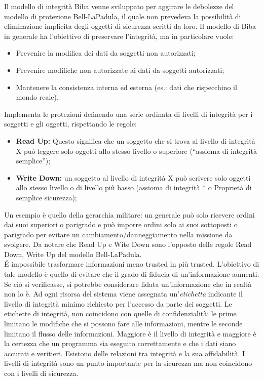 Il modello di integrità Biba venne sviluppato per aggirare le debolezze del 
modello di protezione
Bell-LaPadula, il quale non prevedeva la possibilità di eliminazione implicita 
degli oggetti di
sicurezza scritti da loro.
Il modello di Biba in generale ha l’obiettivo di preservare l'integrità, ma in 
particolare vuole:

\begin{itemize}
      \item Prevenire la modifica dei dati da soggetti non autorizzati;
      \item Prevenire modifiche non autorizzate ai dati da soggetti autorizzati;
      \item Mantenere la consistenza interna ed esterna (es.: dati che
            rispecchino il mondo reale).
\end{itemize}

Implementa le protezioni definendo una serie ordinata di livelli di integrità 
per i soggetti e gli
oggetti, rispettando le regole:

\begin{itemize}
      \item \textbf{Read Up:} Questo significa che
            un soggetto che si trova al livello di integrità X può leggere 
            solo oggetti allo stesso livello o
            superiore (“assioma di integrità semplice”);
      \item \textbf{Write Down:} un soggetto al livello di integrità X può
            scrivere solo oggetti allo stesso livello
            o di livello più basso (assioma di integrità * o Proprietà di 
            semplice sicurezza);
\end{itemize}
Un esempio è quello della gerarchia militare: un generale può solo ricevere 
ordini dai suoi superiori o parigrado e può imporre ordini solo ai suoi 
sottoposti o parigrado per evitare un cambiamento/danneggiamento 
nella missione da svolgere.
Da notare che Read Up e Wite Down sono l'opposto delle regole Read Down, 
Write Up del modello Bell-LaPadula.\\

\'{E} impossibile trasformare informazioni meno trusted in più trusted.
L’obiettivo di tale modello è quello di evitare che il grado di fiducia di 
un’informazione aumenti. Se ciò
si verificasse, si potrebbe considerare fidata un’informazione che in realtà 
non lo è.
Ad ogni risorsa del sistema viene assegnata un’\textit{etichetta} indicante 
il livello di integrità minimo
richiesto per l’accesso da parte dei soggetti. Le etichette di integrità, 
non coincidono con quelle di
confidenzialità: le prime limitano le modifiche che si possono fare alle 
informazioni, mentre le
seconde limitano il flusso delle informazioni. Maggiore è il livello di 
integrità e maggiore è la
certezza che un programma sia eseguito correttamente e che i dati siano accurati
e veritieri.
Esistono delle relazioni tra integrità e la sua affidabilità. I livelli di 
integrità sono un punto
importante per la sicurezza ma non coincidono con i livelli di sicurezza.\\

